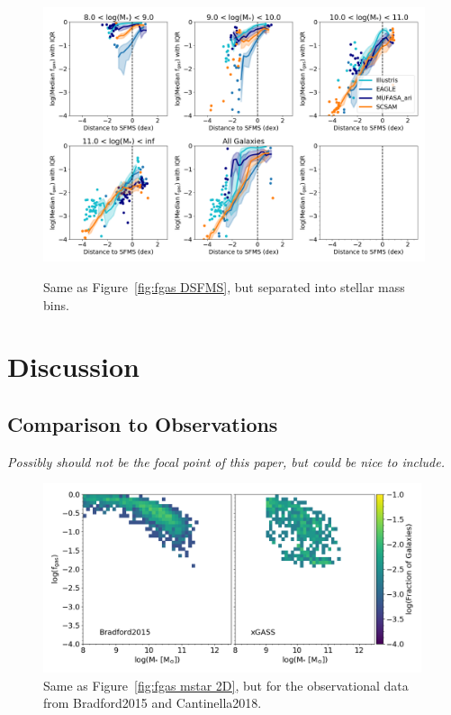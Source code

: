 \documentclass[fleqn,usenatbib]{mnras}
\begin{document}
\begin{figure}
\includegraphics[width = 0.99\linewidth]{fgas_DSFMS_panel_plot_IQR_logged.png}\\
\caption{Same as Figure~\ref{fig:fgas DSFMS}, but separated into stellar mass bins.}
\label{fig:fgas DSFMS panel}
\end{figure}



\section{Discussion}

\subsection{Comparison to Observations}
\label{sec:observations}
{\it Possibly should not be the focal point of this paper, but could be nice to include. } 

\begin{figure}
\includegraphics[width = 0.99\textwidth]{fgas_mstar_2D_log_fgas_obs.png}
\caption{Same as Figure~\ref{fig:fgas mstar 2D}, but for the observational data from Bradford2015 and Cantinella2018.}
\label{fig:fgas mstar 2D obs}
\end{figure}
\end{document}
